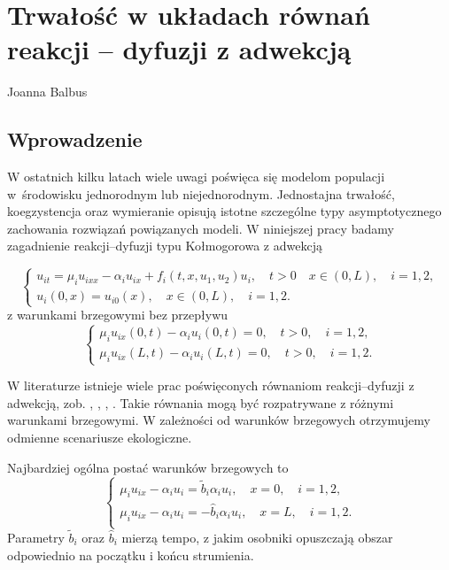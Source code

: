 \newcommand{\p}{\mathcal{P}}
\chapter[Trwałość w układach \ldots]{Trwało\'s\'c w układach równa\'n reakcji -- dyfuzji z adwekcj\k{a}}

\thispagestyle{empty}
\vspace{-8mm} {\large Joanna Balbus} \vspace{8mm}

	\section{Wprowadzenie}
	W ostatnich kilku latach wiele uwagi poświęca się modelom populacji w~środowisku jednorodnym lub niejednorodnym.
	Jednostajna trwałość, koegzystencja oraz wymieranie opisują istotne szczególne typy asymptotycznego zachowania rozwiązań powiązanych modeli. W niniejszej pracy badamy zagadnienie reakcji–dyfuzji typu Kołmogorowa z adwekcją
	
	\begin{equation}
		\label{1.1}
		\begin{cases}
			u_{it}=\mu_i  u_{ixx}  -\alpha_i  u_{ix} + f_i(t,x,u_1,u_2)u_i, \quad t>0 \quad x\in (0,L),\quad i=1,2,\\
			u_i(0,x)=u_{i0}(x), \quad x\in (0,L),\quad i=1,2.
		\end{cases}
	\end{equation}
	z warunkami brzegowymi bez przepływu
	\begin{equation}
		\label{1.2}
		\begin{cases}
			\mu_i u_{ix}(0,t) - \alpha_i u_i(0,t)=0, \quad t>0, \quad i=1,2, \\
			\mu_i u_{ix}(L,t) - \alpha_i u_i(L,t) = 0, \quad t>0, \quad i=1,2.
		\end{cases}
	\end{equation}
	
	W  literaturze istnieje wiele prac poświęconych równaniom reakcji–dyfuzji z adwekcją, zob. \cite{Hess,Huisman}, 
	\cite{Kolokolnikov,Lutscher},  \cite{Ma,Vasilyeva}, .
	Takie równania mogą być rozpatrywane z różnymi warunkami brzegowymi. W zależności od warunków brzegowych
	otrzymujemy odmienne scenariusze ekologiczne.
	
	Najbardziej ogólna postać warunków brzegowych to
	\begin{equation}
		\begin{cases}
			\mu_i u_{ix} - \alpha_i u_{i} =\tilde{b}_{i}\alpha_i u_i, \quad x=0,\quad i=1,2,\\
			\mu_i u_{ix} - \alpha_i u_{i} =-\hat{b}_{i}\alpha_i u_i, \quad x=L, \quad i=1,2.\\
		\end{cases}
	\end{equation}
	Parametry $\tilde{b}_i$ oraz $\hat{b}_i$ mierzą  tempo, z jakim osobniki opuszczają obszar odpowiednio na początku i końcu strumienia.
	
